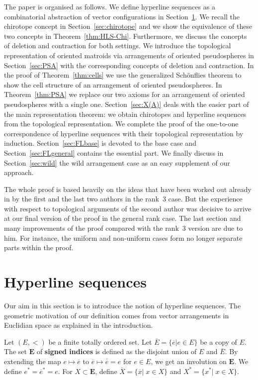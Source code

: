 \documentclass[a4paper]{amsart}
\newcommand{\begriff}[1]{\textbf{#1}}
\theoremstyle{definition}
\theoremstyle{remark}
\begin{document}
The paper is organised as follows.  We define hyperline sequences as a
combinatorial abstraction of vector configurations in 
Section~\ref{sec:HLS}. 
%
We recall the chirotope concept in Section~\ref{sec:chirotope} and we
show the equivalence of these two concepts in
Theorem~\ref{thm:HLS-Chi}.  Furthermore, we discuss the concepts of
deletion and contraction for both settings.
%
We introduce the topological representation of oriented matroids via
arrangements of oriented pseudospheres in Section~\ref{sec:PSA} with
the corresponding concepts of deletion and contraction. In the proof
of Theorem~\ref{thm:cells} we use the generalized Sch\"onflies theorem
to show the cell structure of an arrangement of oriented
pseudospheres.  In Theorem~\ref{thm:PSA} we replace our two axioms for
an arrangement of oriented pseudospheres with a single one.
%
Section~\ref{sec:X(A)} deals with the easier part of the main
representation theorem: we obtain chirotopes and hyperline sequences
from the topological representation.
%
We complete the proof of the one-to-one correspondence of hyperline
sequences with their topological representation by induction.
Section~\ref{sec:FLbase} is devoted to the base case and
Section~\ref{sec:FLgeneral} contains the essential part.
%
We finally discuss in Section~\ref{sec:wild} the wild arrangement case
as an easy supplement of our approach.

The whole proof is based heavily on the ideas that have been worked
out already in \cite{bokowskimockstreinu} by the first and the last
two authors in the rank~$3$ case.  But the experience with respect to
topological arguments of the second author was decisive to arrive at
our final version of the proof in the general rank case.  The last
section and many improvements of the proof compared with the rank~3
version are due to him. For instance, the uniform and non-uniform
cases form no longer separate parts within the proof.




\section{Hyperline sequences}
\label{sec:HLS}

Our aim in this section is to introduce the notion of hyperline
sequences.
The geometric motivation of our definition comes from vector arrangements in
Euclidian space as explained in the introduction.

Let $(E,<)$ be a finite totally ordered set. 
Let $\overline E = \{\overline e | e\in E\}$ be a copy of $E$. 
The set $\mathbf E$ of \begriff{signed indices} is defined as the
disjoint union of $E$ and $\overline E$. 
%
By extending the map $e\mapsto \overline e$ to $\overline e\mapsto
\overline{\overline e} = e$ for $e\in E$, we get an involution
on $\mathbf E$. 
We define $e^*= \overline{e}^* = e$. 
For $X\subset \mathbf E$, define $\overline X= \{\overline x|\;
x\in X\}$ and $X^* = \{x^* |\; x\in X\}$. 
\end{document}
